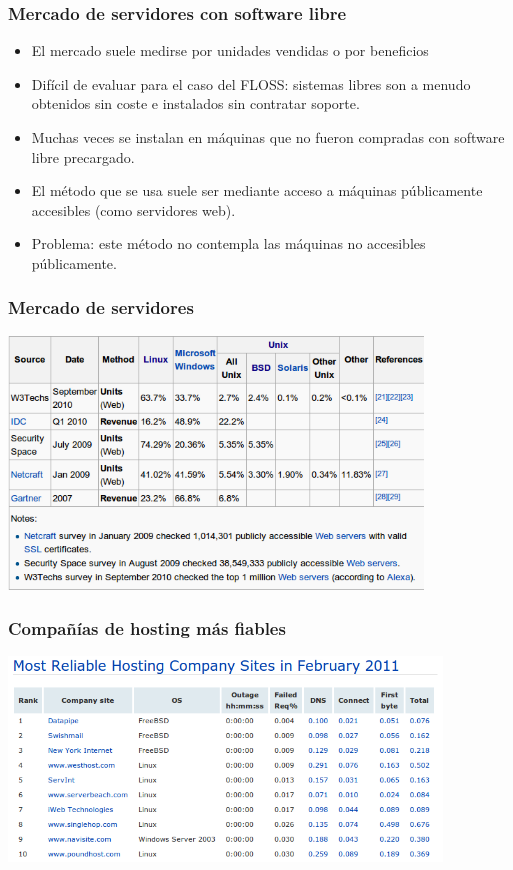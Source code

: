 \documentclass{beamer}
\begin{document}
\begin{frame}
\frametitle{Mercado de servidores con software libre}

\begin{itemize}
\item El mercado suele medirse por unidades vendidas o por beneficios
\item Difícil de evaluar para el caso del FLOSS: sistemas libres son a menudo obtenidos sin coste e instalados sin contratar soporte.
\item Muchas veces se instalan en máquinas que no fueron compradas con software libre precargado.
\item El método que se usa suele ser mediante acceso a máquinas públicamente accesibles (como servidores web).
\item Problema: este método no contempla las máquinas no accesibles públicamente.
\end{itemize}
\end{frame}



\begin{frame}
\frametitle{Mercado de servidores}

\begin{center}
\includegraphics[width=11.0cm]{figs/servers-market.png}
\end{center}

\end{frame}


\begin{frame}
\frametitle{Compañías de hosting más fiables}

\begin{center}
\includegraphics[width=11.5cm]{figs/netcraft.png}
\end{center}

\end{frame}
\end{document}
